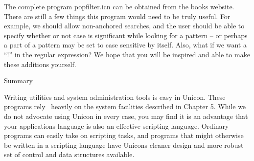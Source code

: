The complete program \textsf{popfilter.icn} can be obtained from the
book{\textquotesingle}s website. There are still a few things this
program would need to be truly useful. For example, we should allow
non-anchored searches, and the user should be able to specify whether
or not case is significant while looking for a pattern -- or perhaps a
part of a pattern may be set to case sensitive by itself. Also, what if
we want a {\textquotedblleft}!{\textquotedblright} in the regular
expression? We hope that you will be inspired and able to make these
additions yourself.

{\sffamily
Summary}

Writing utilities and system administration tools is easy in Unicon.
These programs rely \ heavily on the system facilities described in
Chapter 5. While we do not advocate using Unicon in every case, you may
find it is an advantage that your applications language is also an
effective scripting language. Ordinary programs can easily take on
scripting tasks, and programs that might otherwise be written in a
scripting language have Unicon{\textquotesingle}s cleaner design and
more robust set of control and data structures available.


\bigskip
